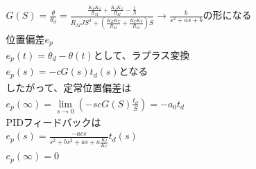 \documentclass[a4j, uplatex, fleqn]{jsarticle}
\begin{document}
\begin{align*}
		&G(S) = \frac{\theta}{\theta_d} = \frac{\frac{K_P K_T}{R_M} + \frac{K_I K_T}{R_M} - \frac{1}{S}}{R_MJS^2 + (\frac{K_E K_T}{R_M} + \frac{K_T K_V}{R_M})S} \rightarrow \frac{b}{s^2 + as +b}\text{の形になる}\\
		&\text{位置偏差}e_p \\
		&e_p(t) = \theta_d - \theta(t) \text{として、ラプラス変換} \\
		&e_p(s) = -cG(s)t_d(s) \text{となる} \\
		&\text{したがって、定常位置偏差は} \\
		&e_p(\infty) = \lim_{s \to 0} (-scG(S) \frac{t_d}{S}) = -a_0 t_d \\
		&\text{PIDフィードバックは}\\
		&e_p(s) = \frac{-acs}{s^2 + bs^2 + as + a\frac{K_I}{K_P}}t_d (s) \\
		&e_p(\infty) = 0
	\end{align*}
\end{document}
